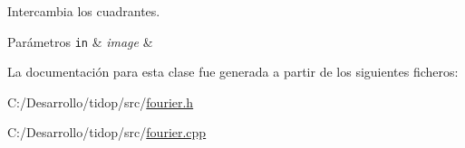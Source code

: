 Intercambia los cuadrantes. 


\begin{DoxyParams}[1]{Parámetros}
\mbox{\tt in}  & {\em image} & \\
\hline
\end{DoxyParams}


La documentación para esta clase fue generada a partir de los siguientes ficheros\+:\begin{DoxyCompactItemize}
\item 
C\+:/\+Desarrollo/tidop/src/\hyperlink{fourier_8h}{fourier.\+h}\item 
C\+:/\+Desarrollo/tidop/src/\hyperlink{fourier_8cpp}{fourier.\+cpp}\end{DoxyCompactItemize}
